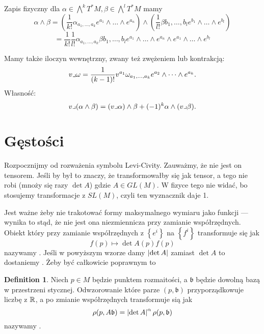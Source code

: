 \documentclass[11pt]{book}
\theoremstyle{definition} %
\newtheorem*{definition}{Definition}
\theoremstyle{plain} %
\theoremstyle{remark} %
\theoremstyle{underline}
\begin{document}
  Zapis fizyczny dla $\alpha \in \bigwedge^kT^*M, \beta \in \bigwedge^lT^*M$ mamy
  \begin{displaymath}
    \alpha \wedge \beta = \left( \frac{1}{k!} \alpha_{a_1,\dots, a_k} e^{a_1} \wedge \dots \wedge e^{a_n} \right)
    \wedge \left( \frac{1}{l!} \beta{b_1,\dots, b_l} e^{b_1} \wedge \dots \wedge e^{b_l} \right)
  \end{displaymath}
  \begin{displaymath}
    = \frac{1}{k!}\frac{1}{l!} \alpha_{a_1,\dots, a_k}\beta{b_1,\dots, b_l} e^{a_1} \wedge \dots \wedge e^{a_n} 
    \wedge    e^{a_1} \wedge \dots \wedge e^{b_l} 
  \end{displaymath}

  Mamy także iloczyn wewnętrzny, zwany też zwężeniem lub kontrakcją:
  \begin{displaymath}
    v \lrcorner \omega = \frac{1}{(k - 1)!} v^{a_1} \omega_{a_1, \dots, a_k} e^{a_2} \wedge \dots \wedge e^{a_k}.
  \end{displaymath}
  Własność:
  \begin{displaymath}
    v \lrcorner (\alpha \wedge \beta) = (v \lrcorner \alpha) \wedge \beta + (-1)^k \alpha \wedge (v \lrcorner \beta).
  \end{displaymath}
  
  \section{Gęstości}
  Rozpocznijmy od rozważenia symbolu Levi-Civity.
  Zauważmy, że nie jest on tensorem. Jeśli by był to znaczy, że transformowałby się jak tensor, 
  a tego nie robi (mnoży się razy $\det A$) gdzie $A \in GL(M)$.
  W fizyce tego nie widać, bo stosujemy transformacje z $SL(M)$, czyli ten wyznacznik daje 1.

  Jest ważne żeby nie trakotować formy maksymalnego wymiaru jako funkcji --- wynika to stąd, że nie 
  jest ona niezmiennicza przy zamianie współrzędnych.
  Obiekt który przy zamianie współrzędnych z $\left\{e^i\right\}$ na $\left\{ f^i \right\}$ 
  transformuje się jak
  \begin{displaymath}
    f(p) \mapsto \det A(p) f(p)
  \end{displaymath}
  nazywamy . 
  Jeśli w powyższym wzorze damy $\left| \det A\right|$ zamiast $\det A$ to 
  dostaniemy . 
  Żeby być całkowicie poprawnym to 
  \begin{definition}
    Niech $p \in M$ będzie punktem rozmaitości, a $\mathfrak{b}$ będzie dowolną bazą w przestrzeni stycznej.
    Odwzorowanie które parze $(p, \mathfrak{b})$ przyporządkowuje liczbę z $\mathbb{R}$, a po zmianie współrzędnych
    transformuje sią jak 
    \begin{displaymath}
      \rho (p, A \mathfrak{b}) = \left| \det A\right|^\alpha \rho(p, \mathfrak{b})
    \end{displaymath}
    nazywamy .
  \end{definition}
  
\end{document}
